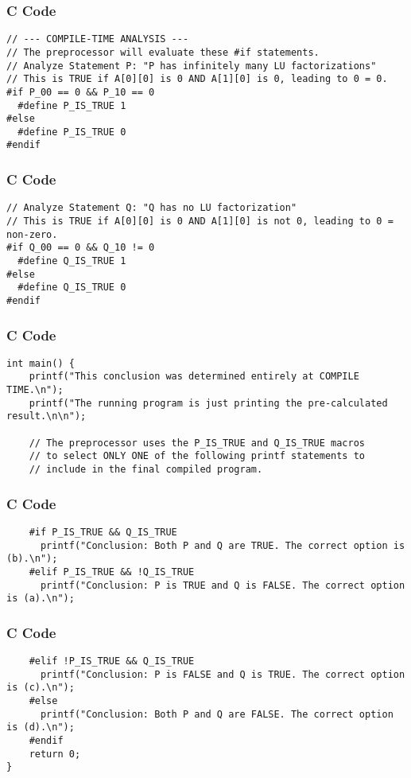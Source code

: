 \documentclass{beamer}
\begin{document}
\begin{frame}[fragile]
\frametitle{C Code}
\begin{lstlisting}
// --- COMPILE-TIME ANALYSIS ---
// The preprocessor will evaluate these #if statements.
// Analyze Statement P: "P has infinitely many LU factorizations"
// This is TRUE if A[0][0] is 0 AND A[1][0] is 0, leading to 0 = 0.
#if P_00 == 0 && P_10 == 0
  #define P_IS_TRUE 1
#else
  #define P_IS_TRUE 0
#endif
\end{lstlisting}
\end{frame}

\begin{frame}[fragile]
\frametitle{C Code}
\begin{lstlisting}
// Analyze Statement Q: "Q has no LU factorization"
// This is TRUE if A[0][0] is 0 AND A[1][0] is not 0, leading to 0 = non-zero.
#if Q_00 == 0 && Q_10 != 0
  #define Q_IS_TRUE 1
#else
  #define Q_IS_TRUE 0
#endif
\end{lstlisting}
\end{frame}

\begin{frame}[fragile]
\frametitle{C Code}
\begin{lstlisting}
int main() {
    printf("This conclusion was determined entirely at COMPILE TIME.\n");
    printf("The running program is just printing the pre-calculated result.\n\n");

    // The preprocessor uses the P_IS_TRUE and Q_IS_TRUE macros
    // to select ONLY ONE of the following printf statements to
    // include in the final compiled program.
\end{lstlisting}
\end{frame}

\begin{frame}[fragile]
\frametitle{C Code}
\begin{lstlisting}
    #if P_IS_TRUE && Q_IS_TRUE
      printf("Conclusion: Both P and Q are TRUE. The correct option is (b).\n");
    #elif P_IS_TRUE && !Q_IS_TRUE
      printf("Conclusion: P is TRUE and Q is FALSE. The correct option is (a).\n");
\end{lstlisting}
\end{frame}

\begin{frame}[fragile]
\frametitle{C Code}
\begin{lstlisting}
    #elif !P_IS_TRUE && Q_IS_TRUE
      printf("Conclusion: P is FALSE and Q is TRUE. The correct option is (c).\n");
    #else
      printf("Conclusion: Both P and Q are FALSE. The correct option is (d).\n");
    #endif
    return 0;
}
\end{lstlisting}
\end{frame}
\end{document}
